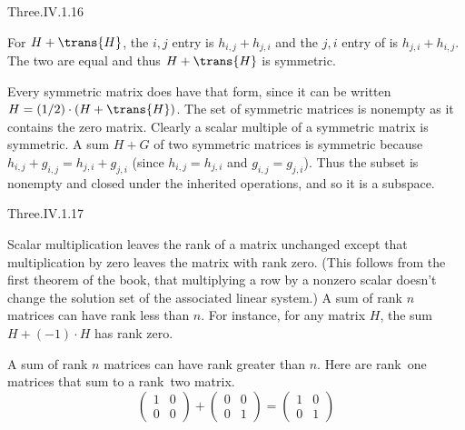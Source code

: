 \begin{ans}{Three.IV.1.16}
      \begin{exparts}
        \partsitem For \( H+\trans{H} \), the \( i,j \) entry
          is \( h_{i,j}+h_{j,i} \) and
          the \( j,i \) entry of  is \( h_{j,i}+h_{i,j} \).
          The two are equal and thus \( H+\trans{H} \) is symmetric.

          Every symmetric matrix does have that form, since it can be written
          \( H=(1/2)\cdot(H+\trans{H}) \).
        \partsitem The set of symmetric matrices is nonempty as it
          contains the zero matrix.
          Clearly a scalar multiple of a symmetric matrix is symmetric.
          A sum \( H+G \) of two symmetric matrices is
          symmetric because \( h_{i,j}+g_{i,j}=h_{j,i}+g_{j,i} \) (since
          \( h_{i,j}=h_{j,i} \) and \( g_{i,j}=g_{j,i} \)).
          Thus the subset is nonempty and closed under the inherited
          operations, and so it is a subspace.
      \end{exparts}
    
\end{ans}
\begin{ans}{Three.IV.1.17}
      \begin{exparts}
        \partsitem Scalar multiplication leaves the rank of a matrix unchanged
          except that multiplication by zero leaves the matrix
          with rank zero.
          (This follows from the first theorem of the book, that multiplying a
          row by a nonzero
          scalar doesn't change the solution set of the associated
          linear system.)
        \partsitem A sum of rank \( n \) matrices can have rank
          less than \( n \).
          For instance,
          for any matrix \( H \), the sum \( H+(-1)\cdot H \) has rank zero.

          A sum of rank \( n \) matrices can have rank greater than \( n \).
          Here are rank~one matrices that sum to a rank~two matrix.
          \begin{equation*}
            \begin{pmatrix}
              1  &0  \\
              0  &0
            \end{pmatrix}
            +\begin{pmatrix}
              0  &0  \\
              0  &1
            \end{pmatrix}
            =\begin{pmatrix}
              1  &0  \\
              0  &1
            \end{pmatrix}
          \end{equation*}
      \end{exparts}
    
\end{ans}
